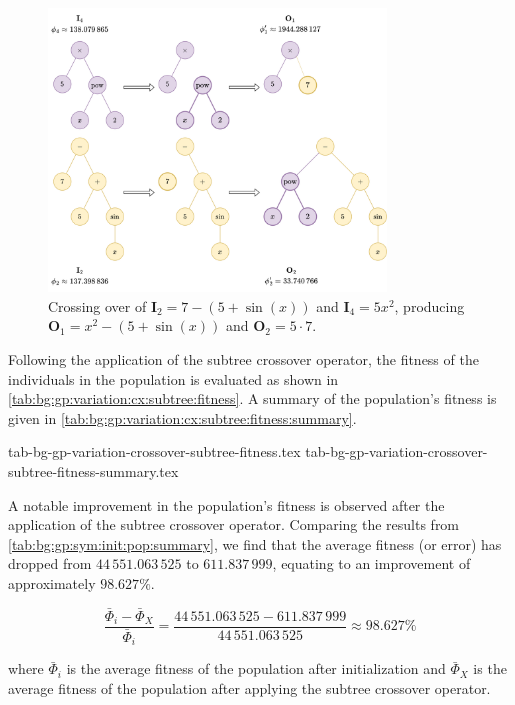   \begin{figure}[ht!]
    \centering
    \includegraphics[width=0.8\textwidth]
      {img/theoretical_framework/GP Crossover.png}
    \caption{
      Crossing over of \(\mathbf{I}_2 = 7 - (5 + \sin(x))\) and 
      \(\mathbf{I}_4 = 5x^2\), producing \(\mathbf{O}_1 = x^2 - (5 + \sin(x))\) 
      and \(\mathbf{O}_2 = 5 \cdot 7\).
    }
    \label{fig:bg:gp:variation:cx:subtree}
  \end{figure}


    Following the application of the subtree crossover operator, the fitness of 
    the individuals in the population is evaluated as shown in 
    \vref{tab:bg:gp:variation:cx:subtree:fitness}.
    A summary of the population's fitness is given in 
    \vref{tab:bg:gp:variation:cx:subtree:fitness:summary}.

    {tab-bg-gp-variation-crossover-subtree-fitness.tex}
    {tab-bg-gp-variation-crossover-subtree-fitness-summary.tex}

    A notable improvement in the population's fitness is observed after the 
    application of the subtree crossover operator.
    Comparing the results from 
    \vref{tab:bg:gp:sym:init:pop:summary}, we find that the 
    average fitness (or error) has dropped from \(44\,551.063\,525\) to 
    \(611.837\,999\), equating to an improvement of approximately \(98.627\%\).

  \[
    \frac{\bar{\Phi}_i - \bar{\Phi}_X}{\bar{\Phi}_i}
     = \frac{44\,551.063\,525 - 611.837\,999}{44\,551.063\,525} \approx 98.627\%
  \]

  where \(\bar{\Phi}_i\) is the average fitness of the population after
  initialization and \(\bar{\Phi}_X\) is the average fitness of the population
  after applying the subtree crossover operator.

